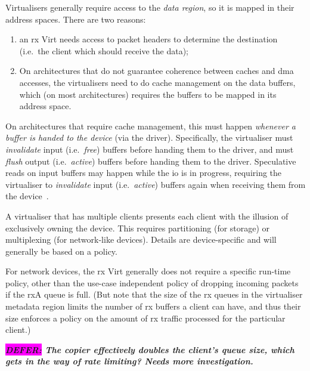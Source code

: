 \documentclass[a4paper,12pt]{report}
\newcommand{\DEFER}[1]{\textbf{\textsl{\colorbox{magenta}{DEFER:} #1}}}
\newcommand{\DEFER}[1]{\relax}
\begin{document}
Virtualisers generally require access to the \emph{data region},
so it is mapped in their address spaces. There are two reasons:
\begin{enumerate}
\item an \gls{rx} Virt needs access to packet headers to determine
  the destination (i.e.\ the client which should receive the data);
\item On architectures that do not guarantee coherence between caches and
  \gls{dma} accesses, the virtualisers need to do cache management on the data buffers, which (on
  most architectures) requires the buffers to be mapped in its address
  space.
\end{enumerate}


On architectures that require cache management, this must happen \emph{whenever
a buffer is handed to the device} (via the driver).
Specifically, the virtualiser must \emph{invalidate} input
(i.e.\ \emph{free}) buffers before handing them to the
driver, and must \emph{flush} output (i.e.\
\emph{active}) buffers before handing them to the driver. Speculative
reads on input buffers may happen while the \gls{io} is in progress,
requiring the virtualiser to \emph{invalidate} input (i.e.\
\emph{active}) buffers again when receiving them from the
device~\citep[p.~33]{Rutland_16}.

A virtualiser that has multiple clients presents each client with the
illusion of exclusively owning the device. This requires partitioning
(for storage) or multiplexing (for network-like devices). Details are
device-specific and will generally be based on a policy.

For network devices, the \gls{rx} Virt generally does not require a specific
run-time policy, other than the use-case independent policy of
dropping incoming packets if the \gls{rx}A queue is full. (But note that the
size of the \gls{rx} queues in the virtualiser metadata region limits the
number of \gls{rx} buffers a client can have, and thus their size enforces a
policy on the amount of \gls{rx} traffic processed for the particular
client.)

\DEFER{The copier effectively doubles the client's queue size, which
  gets in the way of rate limiting? Needs more investigation.}
\end{document}
